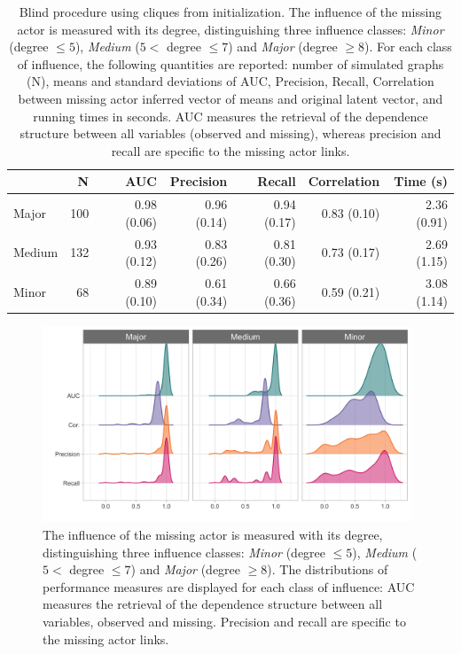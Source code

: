 \begin{table}
\centering
\begin{tabular}{lrrrrrr}
  \hline
  & N & AUC & Precision & Recall & Correlation & Time (s) \\ 
  \hline
 Major & 100 & 0.98 (0.06) & 0.96 (0.14) & 0.94 (0.17) & 0.83 (0.10)& 2.36 (0.91)  \\ 
 Medium & 132 & 0.93 (0.12) & 0.83 (0.26) & 0.81 (0.30) & 0.73 (0.17)& 2.69 (1.15)  \\ 
 Minor &  68 & 0.89 (0.10) & 0.61 (0.34) & 0.66 (0.36) & 0.59 (0.21) & 3.08 (1.14) \\ 
   \hline
\end{tabular}
\caption{\label{tab:perf}Blind procedure using cliques from initialization. The influence of the missing actor is measured with its degree, distinguishing three influence classes: \textit{Minor} (degree $\leq 5$), \textit{Medium} ($5<$ degree $\leq 7$) and \textit{Major} (degree $\geq 8$).  For each class of influence, the following quantities are reported:  number of simulated graphs (N), means and standard deviations of AUC, Precision, Recall, Correlation between missing actor inferred vector of means and original latent vector, and running times in seconds. AUC measures the retrieval of the dependence structure between all variables (observed and missing), whereas precision and recall are specific to the missing actor links.} 

\end{table}
 
 

\begin{figure}[H]
    \centering
    \includegraphics[width=11cm]{figs/simu_densities.png}
    \caption{
    The influence of the missing actor is measured with its degree, distinguishing three influence classes: \textit{Minor} (degree $\leq 5$), \textit{Medium} ($5<$ degree $\leq 7$) and \textit{Major} (degree $\geq 8$). 
    The distributions of performance measures are displayed for each class of influence: AUC measures the retrieval of the dependence structure between all variables, observed and missing.  Precision and recall are specific to the missing actor links. 
    }
    \label{fig:densities}
\end{figure}
 

